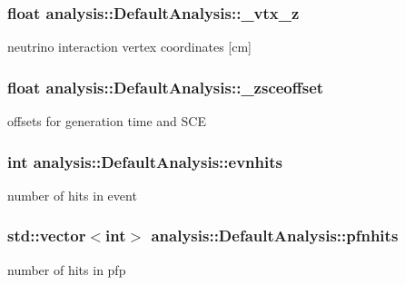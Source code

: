 \subsubsection[{\texorpdfstring{\+\_\+vtx\+\_\+z}{_vtx_z}}]{\setlength{\rightskip}{0pt plus 5cm}float analysis\+::\+Default\+Analysis\+::\+\_\+vtx\+\_\+z\hspace{0.3cm}{\ttfamily [private]}}\hypertarget{classanalysis_1_1DefaultAnalysis_afd279ca3ddc976b3d509e6c09c0c1514}{}\label{classanalysis_1_1DefaultAnalysis_afd279ca3ddc976b3d509e6c09c0c1514}
neutrino interaction vertex coordinates \mbox{[}cm\mbox{]} 
\subsubsection[{\texorpdfstring{\+\_\+zsceoffset}{_zsceoffset}}]{\setlength{\rightskip}{0pt plus 5cm}float analysis\+::\+Default\+Analysis\+::\+\_\+zsceoffset\hspace{0.3cm}{\ttfamily [private]}}\hypertarget{classanalysis_1_1DefaultAnalysis_af2471e0f1bf6cf3c5bec18f830f41c8d}{}\label{classanalysis_1_1DefaultAnalysis_af2471e0f1bf6cf3c5bec18f830f41c8d}
offsets for generation time and S\+CE 
\subsubsection[{\texorpdfstring{evnhits}{evnhits}}]{\setlength{\rightskip}{0pt plus 5cm}int analysis\+::\+Default\+Analysis\+::evnhits\hspace{0.3cm}{\ttfamily [private]}}\hypertarget{classanalysis_1_1DefaultAnalysis_a32911aea589477a3832a4de8d134696d}{}\label{classanalysis_1_1DefaultAnalysis_a32911aea589477a3832a4de8d134696d}
number of hits in event 
\subsubsection[{\texorpdfstring{pfnhits}{pfnhits}}]{\setlength{\rightskip}{0pt plus 5cm}std\+::vector$<$int$>$ analysis\+::\+Default\+Analysis\+::pfnhits\hspace{0.3cm}{\ttfamily [private]}}\hypertarget{classanalysis_1_1DefaultAnalysis_a8d010c569e35c153059a6db573b9542d}{}\label{classanalysis_1_1DefaultAnalysis_a8d010c569e35c153059a6db573b9542d}
number of hits in pfp 
